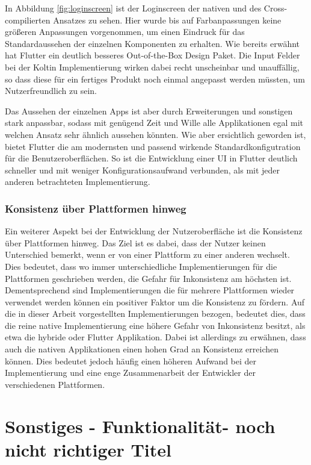 In Abbildung \ref{fig:loginscreen} ist der Loginscreen der nativen und des Cross-compilierten Ansatzes zu sehen. Hier wurde bis auf Farbanpassungen keine größeren Anpassungen vorgenommen, um einen Eindruck für das Standardaussehen der einzelnen Komponenten zu erhalten. Wie bereits erwähnt hat Flutter ein deutlich besseres Out-of-the-Box Design Paket. Die Input Felder bei der Koltin Implementierung wirken dabei recht unscheinbar und unauffällig, so dass diese für ein fertiges Produkt noch einmal angepasst werden müssten, um Nutzerfreundlich zu sein.

Das Aussehen der einzelnen Apps ist aber durch Erweiterungen und sonstigen stark anpassbar, sodass mit genügend Zeit und Wille alle Applikationen egal mit welchen Ansatz sehr ähnlich aussehen könnten. Wie aber ersichtlich geworden ist, bietet Flutter die am modernsten und passend wirkende Standardkonfigutration für die Benutzeroberflächen. So ist die Entwicklung einer \ac{UI} in Flutter deutlich schneller und mit weniger Konfigurationsaufwand verbunden, als mit jeder anderen betrachteten Implementierung.

\subsubsection{Konsistenz über Plattformen hinweg}
Ein weiterer Aspekt bei der Entwicklung der Nutzeroberfläche ist die Konsistenz über Plattformen hinweg. Das Ziel ist es dabei, dass der Nutzer keinen Unterschied bemerkt, wenn er von einer Plattform zu einer anderen wechselt. 
Dies bedeutet, dass wo immer unterschiedliche Implementierungen für die Plattformen geschrieben werden, die Gefahr für Inkonsistenz am höchsten ist.
Dementsprechend sind Implementierungen die für mehrere Plattformen wieder verwendet werden können ein positiver Faktor um die Konsistenz zu fördern.
Auf die in dieser Arbeit vorgestellten Implementierungen bezogen, bedeutet dies, dass die reine native Implementierung eine höhere Gefahr von Inkonsistenz besitzt, als etwa die hybride oder Flutter Applikation.
Dabei ist allerdings zu erwähnen, dass auch die nativen Applikationen einen hohen Grad an Konsistenz erreichen können. Dies bedeutet jedoch häufig einen höheren Aufwand bei der Implementierung und eine enge Zusammenarbeit der Entwickler der verschiedenen Plattformen.

\section{Sonstiges - Funktionalität- noch nicht richtiger Titel}

